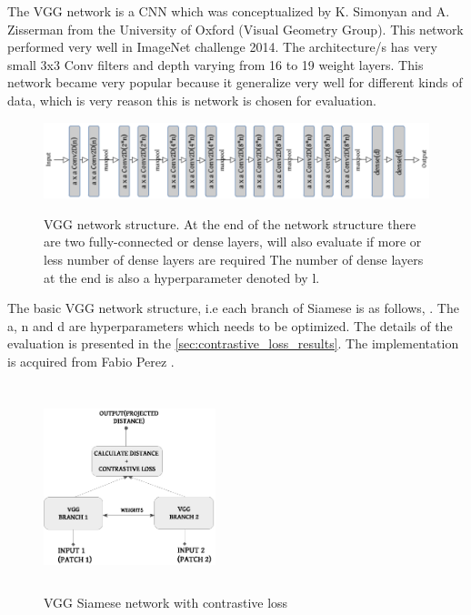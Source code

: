 The VGG network \cite{VGG} is a CNN which was conceptualized by K. Simonyan and A. Zisserman from the University of Oxford (Visual Geometry Group). This network performed very well in ImageNet challenge 2014. The architecture/s has 
very small 3x3 Conv filters and depth varying from 16 to 19 weight layers. This network became very popular because it generalize very well for different kinds of data, which is very reason this is network is chosen for evaluation.

\begin{figure}[ht]
\centering
\includegraphics[width=14cm]{images/contrastive/VGG_network_structure}
\label{fig:VGG_network_structure}
\caption{VGG network structure. At the end of the network structure there are two fully-connected or dense layers, will also evaluate if more or less number of dense layers are required
The number of dense layers at the end is also a hyperparameter denoted by l.}
\end{figure} 

The basic VGG network structure, i.e each branch of Siamese is as follows, . The a, n and d are hyperparameters which needs to be optimized. The details of the evaluation is presented in the \autoref{sec:contrastive_loss_results}.
The implementation is acquired from Fabio Perez \cite{vggimpl}.

\begin{figure}
\hspace{1cm}
\includegraphics[height=6cm,width=5cm]{images/contrastive/siamese_contrastive_loss}
\caption{VGG Siamese network with contrastive loss}
\label{fig:network_structure_vgg_siamese}
\end{figure} 

